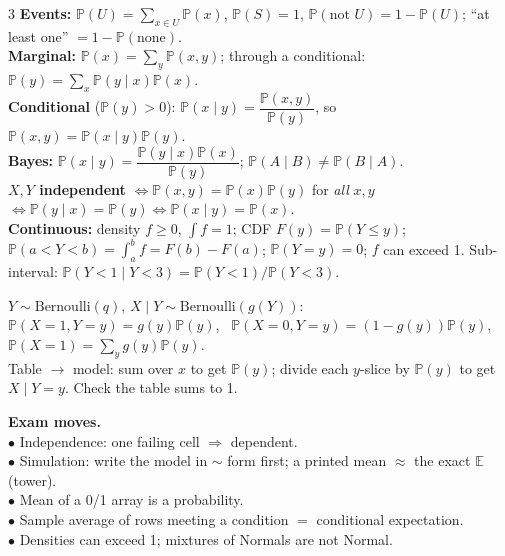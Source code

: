 \documentclass[11pt]{article}
\newcommand{\E}{\mathbb{E}}
\renewcommand{\P}{\mathbb{P}}
\newcommand{\given}{\mid}
\newcommand{\Bern}{\text{Bernoulli}}
\begin{document}
\begin{landscape}
\begin{multicols}{3}
\textbf{Events:} $\P(U)=\sum_{x\in U}\P(x)$, $\P(S)=1$, $\P(\text{not }U)=1-\P(U)$; ``at least one'' $=1-\P(\text{none})$.\\
\textbf{Marginal:} $\P(x)=\sum_y\P(x,y)$; through a conditional: $\P(y)=\sum_x\P(y\given x)\P(x)$.\\
\textbf{Conditional} ($\P(y)>0$): $\P(x\given y)=\dfrac{\P(x,y)}{\P(y)}$, so $\P(x,y)=\P(x\given y)\P(y)$.\\
\textbf{Bayes:} $\P(x\given y)=\dfrac{\P(y\given x)\P(x)}{\P(y)}$; $\P(A\given B)\ne\P(B\given A)$.\\
\textbf{$X,Y$ independent} $\iff\P(x,y)=\P(x)\P(y)$ for \emph{all} $x,y$ $\iff\P(y\given x)=\P(y)\iff\P(x\given y)=\P(x)$.\\
\textbf{Continuous:} density $f\ge0$, $\int f=1$; CDF $F(y)=\P(Y\le y)$; $\P(a<Y<b)=\int_a^bf=F(b)-F(a)$; $\P(Y{=}y)=0$; $f$ can exceed 1. Sub-interval: $\P(Y<1\given Y<3)=\P(Y<1)/\P(Y<3)$.

$Y\sim\Bern(q)$, $X\given Y\sim\Bern(g(Y))$:\\
$\P(X{=}1,Y{=}y)=g(y)\P(y)$, \ $\P(X{=}0,Y{=}y)=(1-g(y))\P(y)$, \ $\P(X{=}1)=\sum_yg(y)\P(y)$.\\
Table $\to$ model: sum over $x$ to get $\P(y)$; divide each $y$-slice by $\P(y)$ to get $X\given Y{=}y$. Check the table sums to 1.

\begin{cbox}
\textbf{Exam moves.}\\
$\bullet$ Independence: one failing cell $\Rightarrow$ dependent.\\
$\bullet$ Simulation: write the model in $\sim$ form first; a printed mean $\approx$ the exact $\E$ (tower).\\
$\bullet$ Mean of a 0/1 array is a probability.\\
$\bullet$ Sample average of rows meeting a condition $=$ conditional expectation.\\
$\bullet$ Densities can exceed 1; mixtures of Normals are not Normal.
\end{cbox}

\columnbreak


\end{multicols}
\end{landscape}
\end{document}
